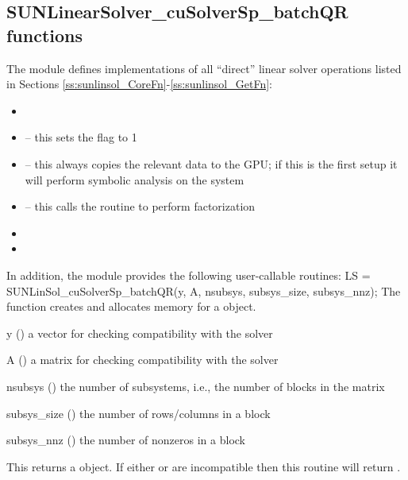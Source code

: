 \subsection{SUNLinearSolver\_cuSolverSp\_batchQR functions}\label{ss:sunlinsol_cuspbqr_functions}

The  module defines implementations of
all ``direct'' linear solver operations listed in
Sections \ref{ss:sunlinsol_CoreFn}-\ref{ss:sunlinsol_GetFn}:
\begin{itemize}
\item {}
\item {} -- this sets the
   flag to 1
\item {} -- this always copies the
  relevant {\sunmatsparse} data to the GPU; if this is the first setup
  it will perform symbolic analysis on the system 
\item {} -- this calls the 
   routine to perform factorization
\item {}
\item {}
\end{itemize}
In addition, the module provides the following user-callable routines: 
{
  LS = SUNLinSol\_cuSolverSp\_batchQR(y, A, nsubsys, subsys\_size, subsys\_nnz);
}
{
  The function  creates and allocates memory for a
  {\sunlinsol} object.
}
{
  \begin{args}
  \item[y] ()
    a {\nveccuda} vector for checking compatibility with the solver
  \item[A] ()
    a {\sunmatsparse} matrix for checking compatibility with the solver
  \item[nsubsys] ()
    the number of subsystems, i.e., the number of blocks in the matrix
  \item[subsys\_size] ()
    the number of rows/columns in a block
  \item[subsys\_nnz] ()
    the number of nonzeros in a block
  \end{args}
}
{
  This returns a  object.  If either  or
   are incompatible then this routine will return .
}
